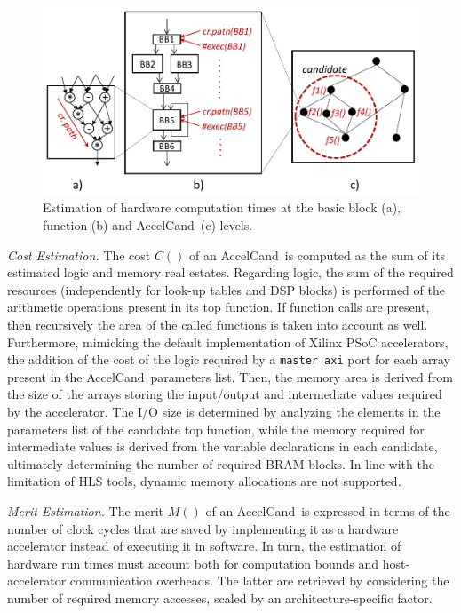 \documentclass[]{usiinfthesis}
\newcommand{\candidate}{{AccelCand}}
\begin{document}
\begin{figure}[!t]
  \centering
  \includegraphics[width=.8\linewidth]{figs/merit_estimation.pdf}
  \caption{Estimation of hardware computation times at the basic block (a), function (b) and 
  \candidate\ (c) levels.}
  \label{fig:hw-comp}
\end{figure}

\emph{Cost Estimation.}
The cost $C()$ of an \candidate\ is computed as the sum of its estimated logic and memory 
real estates. Regarding logic, the sum of the required resources (independently for look-up 
tables and DSP blocks) is performed of the arithmetic operations present in its top function.
If function calls are present, then recursively the area of the called functions is taken into
account as well. Furthermore, mimicking the default implementation of Xilinx PSoC accelerators, 
the addition of the cost of the logic required by a \texttt{master axi} port for each array 
present in the \candidate\ parameters list.
Then, the memory area is derived from the size of the arrays storing the input/output and intermediate 
values required by the accelerator. The I/O size is determined by analyzing the elements in the 
parameters list of the candidate top function, while the memory required for intermediate values is 
derived from the variable declarations in each candidate, ultimately determining the number of required 
BRAM blocks. In line with the limitation of HLS tools, dynamic memory allocations are not supported.\par

\emph{Merit Estimation.}
The merit $M()$ of an \candidate\ is expressed in terms of the number of clock cycles that are saved by 
implementing it as a hardware accelerator instead of executing it in software. In turn, the estimation 
of hardware run times must account both for computation bounds and host-accelerator communication overheads.  
The latter are retrieved by considering the number of required memory accesses, scaled by an 
architecture-specific factor.\par
\end{document}
